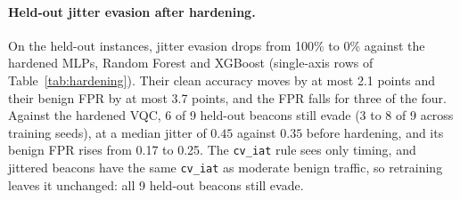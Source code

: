 \documentclass[preprint,12pt]{elsarticle}
\begin{document}
\paragraph{Held-out jitter evasion after hardening.} On the held-out instances, jitter evasion drops
from 100\% to 0\% against the hardened MLPs, Random Forest and XGBoost (single-axis rows of Table~\ref{tab:hardening}). Their
clean accuracy moves by at most 2.1 points and their benign FPR by at most 3.7 points, and the FPR falls
for three of the four. Against the hardened VQC, 6 of 9 held-out beacons still evade (3 to 8 of 9 across
training seeds), at a median jitter
of $0.45$ against $0.35$ before hardening, and its benign FPR rises from 0.17 to 0.25. The \texttt{cv\_iat} rule sees only timing, and jittered beacons have the same
\texttt{cv\_iat} as moderate benign traffic, so retraining leaves it unchanged: all 9 held-out beacons
still evade.
\end{document}
